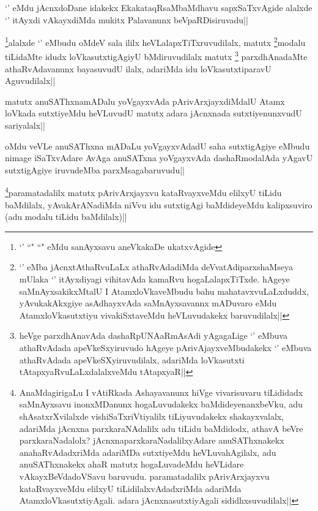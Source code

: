 \begin{artha}
`\stext' eMdu jAcnxdoDane idakekx EkakataqRsaMbaMdhavu sapxSaTxvAgide alalxde `\stext' itAyxdi vAkayxdiMda mukitx Palavanunx beVpaRDisiruvadu||
\end{artha}

\begin{artha}
\footnote{`\stext' ``\stext" ``\stext" eMdu sanAyxsavu aneVkakaDe ukatxvAgide}alalxde `\stext' eMbudu oMdeV sala ililx heVLalapxTiTxruvudilalx, matutx \footnote{`\stext' eMba jAcnxtAthaRvuLaLx athaRvAdadiMda deVvatAdiparxshaMseya mUlaka `\stext' itAyxdiyagi vihitavAda kamaRvu hogaLalapxTiTxde. hAgeye saMnAyxsakikxMtalU I AtamxloVkaveMbudu bahu mahatavxvuLaLxduddx, yAvukakAkxgiye asAdhayxvAda saMnAyxsavannx mADuvaro eMdu AtamxloVkasutxtiyu vivakiSxtaveMdu heVLuvudakekx baruvudilalx||}modalu tiLidaMte idudx loVkasutxtigAgiyU bMdiruvudilalx matutx \footnote{heVge parxdhAnavAda dashaRpUNAaRmAsAdi yAgagaLige `\stext' eMbuva athaRvAdada apeVkeSxyiruvudo hAgeye pArivAjayxveMbudakekx `\stext' eMbuva athaRvAdada apeVkeSXyiruvudilalx, adariMda loVkasutxti tAtapxyaRvuLaLxdalalxveMdu tAtapxyaR||} parxdhAnadaMte athaRvAdavanunx bayasuvudU ilalx, adariMda idu loVkasutxtiparavU Aguvudilalx||
\end{artha}

\begin{artha}
matutx anuSAThxnamADalu yoVgayxvAda pArivArxjayxdiMdalU Atamx loVkada sutxtiyeMdu heVLuvudU matutx adara jAcnxnada sutxtiyenunxvudU sariyalalx||
\end{artha}

\begin{artha}
oMdu veVLe anuSAThxna mADaLu yoVgayxvAdadU saha sutxtigAgiye eMbudu nimage iSaTxvAdare AvAga anuSATxna yoVgayxvAda dashaRmodalAda yAgavU sutxtigAgiye iruvudeMba parxMsagabaruvudu||
\end{artha}


\begin{artha}
\footnote{AnaMdagirigaLu I vAtiRkada Ashayavanunx hiVge vivarisuvaru tiLididadx saMnAyxsavu inonxMDanunx hogaLuvudakekx baMdideyenanxbeVku, adu shAsatxrXvilalxde vishiSaTxriVtiyalilx tiLiyuvudakekx shakayxvalalx, adariMda jAcnxna parxkaraNAdalilx adu tiLidu baMdidodx, athavA beVre parxkaraNadalolx? jAcnxnaparxkaraNadalilxyAdare anuSAThxnakekx anahaRvAdadxriMda adariMDa sutxtiyeMdu heVLuvahAgilalx, adu anuSAThxnakekx ahaR matutx hogaLuvadeMdu heVLidare vAkayxBeVdadoVSavu baruvudu. paramatadalilx pArivArxjayxvu kataRvayxveMdu elilxyU tiLidilalxvAdadxriMda adariMda AtamxloVkasutxtiyAgali. adara jAcnxnasutxtiyAgali sididhxsuvudilalx||}paramatadalilx matutx pArivArxjayxvu kataRvayxveMdu elilxyU tiLidu baMdilalx, yAvakArANadiMda niVvu idu sutxtigAgi baMdideyeMdu kalipxsuviro (adu modalu tiLidu baMdilalx)||
\end{artha}

